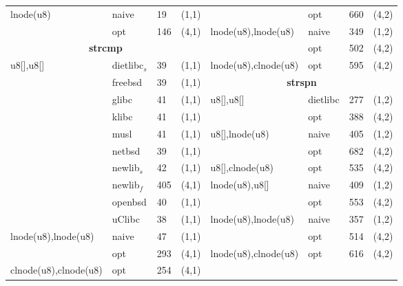 \begin{table}[H]
\begin{center}
\begin{scriptsize}
\begin{tabular}{@{}l@{\hspace{5px}}l@{\hspace{5px}}l@{\hspace{5px}}cl@{\hspace{5px}}l@{\hspace{5px}}l@{\hspace{5px}}c@{}}
lnode(u8) & naive & 19 & (1,1) &                             & opt & 660 & (4,2) \\
            & opt & 146 & (4,1) &                            lnode(u8),lnode(u8) & naive & 349 & (1,2) \\
\multicolumn{4}{c}{\bf strcmp}   &                           & opt & 502 & (4,2) \\
u8[],u8[] & dietlibc$_s$ & 39 & (1,1) &      lnode(u8),clnode(u8) & opt & 595 & (4,2) \\
       & freebsd & 39 & (1,1) &                              \multicolumn{4}{c}{\bf strspn} \\
       & glibc & 41 & (1,1) &                                u8[],u8[] & dietlibc & 277 & (1,2) \\
       & klibc & 41 & (1,1) &                                & opt      & 388 & (4,2) \\
       & musl & 41 & (1,1) &                                 u8[],lnode(u8) & naive & 405 & (1,2) \\
       & netbsd & 39 & (1,1) &                               & opt & 682 & (4,2) \\
       & newlib$_s$ & 42 & (1,1) &            u8[],clnode(u8) & opt & 535 & (4,2) \\
       & newlib$_f$ & 405 & (4,1) &            lnode(u8),u8[] & naive & 409 & (1,2) \\
       & openbsd & 40 & (1,1) &                              & opt & 553 & (4,2) \\
       & uClibc & 38 & (1,1) &                               lnode(u8),lnode(u8) & naive & 357 & (1,2) \\
lnode(u8),lnode(u8) & naive & 47 & (1,1) &                   & opt & 514 & (4,2) \\
            & opt & 293 & (4,1) &                            lnode(u8),clnode(u8) & opt & 616 & (4,2) \\
clnode(u8),clnode(u8) & opt & 254 & (4,1) &                  & & & \\
\bottomrule
\end{tabular}
\end{scriptsize}
\end{center}
\end{table}